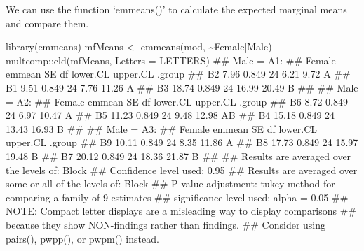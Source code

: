 \documentclass[a4paper,12pt,oneside]{book}
\newenvironment{Shaded}{\begin{snugshade}}{\end{snugshade}}
\newcommand{\SpecialCharTok}[1]{#1}
\newcommand{\DocumentationTok}[1]{#1}
\newcommand{\OtherTok}[1]{#1}
\newcommand{\FunctionTok}[1]{#1}
\newcommand{\AttributeTok}[1]{#1}
\newcommand{\AlertTok}[1]{#1}
\newcommand{\NormalTok}[1]{#1}
\begin{document}
We can use the function `emmeans()' to calculate the expected marginal means and compare them.

\vspace{12pt}

\begin{Shaded}
\begin{Highlighting}[]
\FunctionTok{library}\NormalTok{(emmeans)}
\NormalTok{mfMeans }\OtherTok{\textless{}{-}} \FunctionTok{emmeans}\NormalTok{(mod, }\SpecialCharTok{\textasciitilde{}}\NormalTok{Female}\SpecialCharTok{|}\NormalTok{Male)}
\NormalTok{multcomp}\SpecialCharTok{::}\FunctionTok{cld}\NormalTok{(mfMeans, }\AttributeTok{Letters =}\NormalTok{ LETTERS)}
\DocumentationTok{\#\# Male = A1:}
\DocumentationTok{\#\#  Female emmean    SE df lower.CL upper.CL .group}
\DocumentationTok{\#\#  B2       7.96 0.849 24     6.21     9.72  A    }
\DocumentationTok{\#\#  B1       9.51 0.849 24     7.76    11.26  A    }
\DocumentationTok{\#\#  B3      18.74 0.849 24    16.99    20.49   B   }
\DocumentationTok{\#\# }
\DocumentationTok{\#\# Male = A2:}
\DocumentationTok{\#\#  Female emmean    SE df lower.CL upper.CL .group}
\DocumentationTok{\#\#  B6       8.72 0.849 24     6.97    10.47  A    }
\DocumentationTok{\#\#  B5      11.23 0.849 24     9.48    12.98  AB   }
\DocumentationTok{\#\#  B4      15.18 0.849 24    13.43    16.93   B   }
\DocumentationTok{\#\# }
\DocumentationTok{\#\# Male = A3:}
\DocumentationTok{\#\#  Female emmean    SE df lower.CL upper.CL .group}
\DocumentationTok{\#\#  B9      10.11 0.849 24     8.35    11.86  A    }
\DocumentationTok{\#\#  B8      17.73 0.849 24    15.97    19.48   B   }
\DocumentationTok{\#\#  B7      20.12 0.849 24    18.36    21.87   B   }
\DocumentationTok{\#\# }
\DocumentationTok{\#\# Results are averaged over the levels of: Block }
\DocumentationTok{\#\# Confidence level used: 0.95 }
\DocumentationTok{\#\# Results are averaged over some or all of the levels of: Block }
\DocumentationTok{\#\# P value adjustment: tukey method for comparing a family of 9 estimates }
\DocumentationTok{\#\# significance level used: alpha = 0.05 }
\DocumentationTok{\#\# }\AlertTok{NOTE}\DocumentationTok{: Compact letter displays are a misleading way to display comparisons}
\DocumentationTok{\#\#       because they show NON{-}findings rather than findings.}
\DocumentationTok{\#\#       Consider using \textquotesingle{}pairs()\textquotesingle{}, \textquotesingle{}pwpp()\textquotesingle{}, or \textquotesingle{}pwpm()\textquotesingle{} instead.}
\end{Highlighting}
\end{Shaded}
\end{document}
